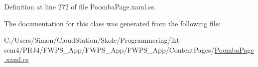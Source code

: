 Definition at line 272 of file Poomba\+Page.\+xaml.\+cs.



The documentation for this class was generated from the following file\+:\begin{DoxyCompactItemize}
\item 
C\+:/\+Users/\+Simon/\+Cloud\+Station/\+Skole/\+Programmering/ikt-\/sem4/\+P\+R\+J4/\+F\+W\+P\+S\+\_\+\+App/\+F\+W\+P\+S\+\_\+\+App/\+F\+W\+P\+S\+\_\+\+App/\+Content\+Pages/\mbox{\hyperlink{_poomba_page_8xaml_8cs}{Poomba\+Page.\+xaml.\+cs}}\end{DoxyCompactItemize}
